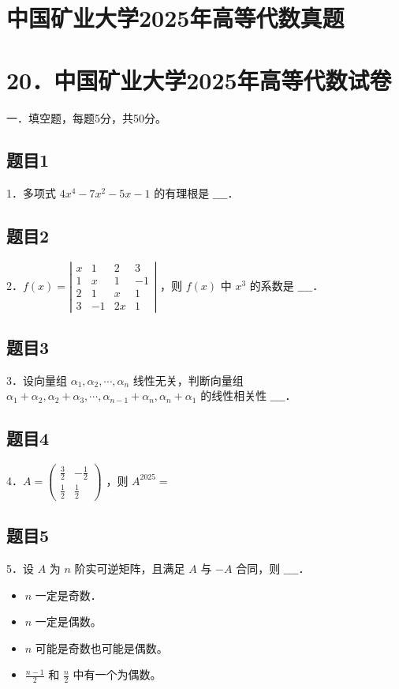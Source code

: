 \documentclass{article}
\begin{document}
\section*{中国矿业大学2025年高等代数真题}
\section*{20．中国矿业大学2025年高等代数试卷}
一．填空题，每题5分，共50分。\\

\subsection{题目1}
1．多项式 \(4 x^{4}-7 x^{2}-5 x-1\) 的有理根是 \(\_\_\_\_\)．

\subsection{题目2}
2．\(f(x)=\left|\begin{array}{cccc}x & 1 & 2 & 3 \\ 1 & x & 1 & -1 \\ 2 & 1 & x & 1 \\ 3 & -1 & 2 x & 1\end{array}\right|\) ，则 \(f(x)\) 中 \(x^{3}\) 的系数是 \(\_\_\_\_\)．

\subsection{题目3}
3．设向量组 \(\alpha_{1}, \alpha_{2}, \cdots, \alpha_{n}\) 线性无关，判断向量组 \(\alpha_{1}+\alpha_{2}, \alpha_{2}+\alpha_{3}, \cdots, \alpha_{n-1}+\alpha_{n}, \alpha_{n}+\alpha_{1}\) 的线性相关性 \(\_\_\_\_\)．

\subsection{题目4}
4．\(A=\left(\begin{array}{cc}\frac{3}{2} & -\frac{1}{2} \\ \frac{1}{2} & \frac{1}{2}\end{array}\right)\) ，则 \(A^{2025}=\)

\subsection{题目5}
5．设 \(A\) 为 \(n\) 阶实可逆矩阵，且满足 \(A\) 与 \(-A\) 合同，则 \(\_\_\_\_\)．

\begin{itemize}
  \item[A．] \(n\) 一定是奇数．
  \item[B．] \(n\) 一定是偶数。
  \item[C．] \(n\) 可能是奇数也可能是偶数。
  \item[D．] \(\frac{n-1}{2}\) 和 \(\frac{n}{2}\) 中有一个为偶数。
\end{itemize}
\end{document}
